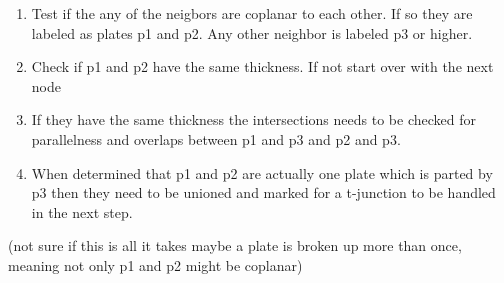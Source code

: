 \documentclass[../ClassicThesis.tex]{subfiles}
\begin{document}
\begin{itemize}
\begin{enumerate}
        \item Test if the any of the neigbors are coplanar to each other. If so they are labeled as plates p1 and p2. Any other neighbor is labeled p3 or higher.
        \item Check if p1 and p2 have the same thickness. If not start over with the next node
        \item If they have the same thickness the intersections needs to be checked for parallelness and overlaps between p1 and p3 and p2 and p3.
        \item When determined that p1 and p2 are actually one plate which is parted by p3 then they need to be unioned and marked for a t-junction to be handled in the next step.
    \end{enumerate}
    (not sure if this is all it takes maybe a plate is broken up more than once, meaning not only p1 and p2 might be coplanar)
\end{itemize}










\end{document}
